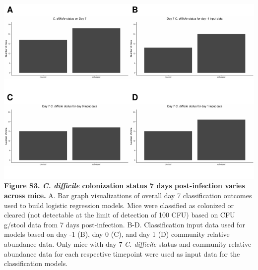 \documentclass[11pt,]{article}
\begin{document}
\includegraphics{figure_S3.pdf} \textbf{Figure S3. \emph{C. difficile}
colonization status 7 days post-infection varies across mice.} A. Bar
graph visualizations of overall day 7 classification outcomes used to
build logistic regression models. Mice were classified as colonized or
cleared (not detectable at the limit of detection of 100 CFU) based on
CFU g/stool data from 7 days post-infection. B-D. Classification input
data used for models based on day -1 (B), day 0 (C), and day 1 (D)
community relative abundance data. Only mice with day 7 \emph{C.
difficile} status and community relative abundance data for each
respective timepoint were used as input data for the classification
models.

\newpage
\end{document}
